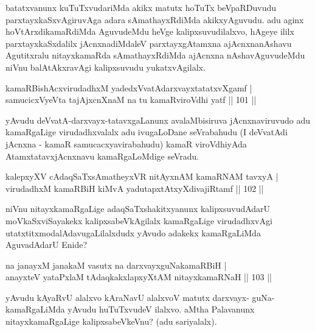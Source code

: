 \begin{artha}
batatxvanunx kuTuTxvudariMda akikx matutx hoTuTx beVpaRDuvudu parxtayxkaSxvAgiruvAga adara sAmathayxRdiMda akikxyAguvudu. adu aginx hoVtArxdikamaRdiMda AguvudeMdu heVge kalipxsuvudilalxvo, hAgeye ililx parxtayxkaSxdalilx jAcnxnadiMdaleV parxtayxgAtamxna ajAcnxnanAshavu Agutitxralu nitayxkamaRda sAmathayxRdiMda ajAcnxna nAshavAguvudeMdu niVnu balAtAkxravAgi kalipxsuvudu yukatxvAgilalx.
\end{artha}


\begin{shl}
kamaRBishAcxvirudadhxM yadedxVvatAdarxvayxtatatxvXgamf |\\
samucicxVyeVta tajAjxcnXnaM na tu kamaRviroVdhi yatf \hfill || 101 ||
\end{shl}

\begin{artha}
yAvudu deVvatA-darxvayx-tatavxgaLanunx avalaMbisiruva jAcnxnaviruvudo adu kamaRgaLige virudadhxvalalx adu ivugaLoDane seVrabahudu (I deVvatAdi jAcnxna - kamaR samucacxyavirabahudu) kamaR viroVdhiyAda AtamxtatavxjAcnxnavu kamaRgaLoMdige seVradu.
\end{artha}

\begin{shl}
kalepxyXV cAdaqSaTxsAmatheyxVR nitAyxnAM kamaRNAM tavxyA |\\
virudadhxM kamaRBiH kiMvA yadutapxtAtxyXdivajiRtamf \hfill || 102 ||
\end{shl}

\begin{artha}
niVnu nitayxkamaRgaLige adaqSaTxshakitxyanunx kalipxsuvudAdarU moVkaSxviSayakekx kalipxsabeVkAgilalx kamaRgaLige virudadhxvAgi utatxtitxmodalAdavugaLilalxdudx yAvudo adakekx kamaRgaLiMda AguvadAdarU Enide?
\end{artha}

\begin{shl}
na janayxM janakaM vasutx na darxvayxguNakamaRBiH |\\
anayxteV yataPxlaM tAdaqkakxlapxyXtAM nitayxkamaRNaH \hfill || 103 ||
\end{shl}

\begin{artha}
yAvudu kAyaRvU alalxvo kAraNavU alalxvoV matutx darxvayx- guNa-kamaRgaLiMda yAvudu huTuTxvudeV ilalxvo. aMtha Palavanunx nitayxkamaRgaLige kalipxsabeVkeVnu? (adu sariyalalx).
\end{artha}

